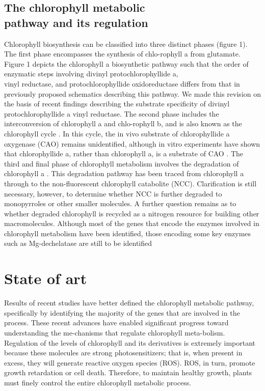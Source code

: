 \documentclass[a4paper, twocolumn, 11pt]{article}
\begin{document}
	\subsection{The chlorophyll metabolic\\ pathway and its regulation} 
	Chlorophyll biosynthesis can be classified into three distinct phases (figure 1). The first phase encompasses the synthesis of chlo-rophyll a from glutamate. Figure 1 depicts the chlorophyll a biosynthetic pathway such that the order of enzymatic steps involving divinyl protochlorophyllide a, \\vinyl reductase, and protochlorophyllide oxidoreductase differs from that in previously proposed schematics describing this pathway. We made this revision on the basis of recent findings describing the substrate specificity of divinyl protochlorophyllide a vinyl reductase. The second phase includes the interconversion of chlorophyll a and chlo-rophyll b, and is also known as the chlorophyll cycle \cite{Rudiger2002}. In this cycle, the in vivo substrate of chlorophyllide a oxygenase (CAO) remains unidentified, although in vitro experiments have shown that chlorophyllide a, rather than chlorophyll a, is a substrate of CAO \cite{Oster2000}. The third and final phase of chlorophyll metabolism involves the degradation of chlorophyll a \cite{Takamiya2000}. This degradation pathway has been traced from chlorophyll a through to the non-fluorescent chlorophyll catabolite (NCC). Clarification is still necessary, however, to determine whether NCC is further degraded to monopyrroles or other smaller molecules. A further question remains as to whether degraded chlorophyll is recycled as a nitrogen resource for building other macromolecules. Although most of the genes that encode the enzymes involved in chlorophyll metabolism have been identified, those encoding some key enzymes such as Mg-dechelatase are still to be identified \cite{Tanaka2006}


\section{State of art}
	Results of recent studies have better defined the chlorophyll metabolic pathway,\\ specifically by identifying the majority of the genes that are involved in the process. These recent advances have enabled significant progress toward understanding the me-chanisms that regulate chlorophyll meta-bolism. Regulation of the levels of chlorophyll and its derivatives is extremely important because these molecules are strong photosensitizers; that is, when present in excess, they will generate reactive oxygen species (ROS). ROS, in turn, promote\\ growth retardation or cell death. Therefore, to maintain healthy growth, plants must finely control the entire chlorophyll metabolic process.\\
	
\end{document}
